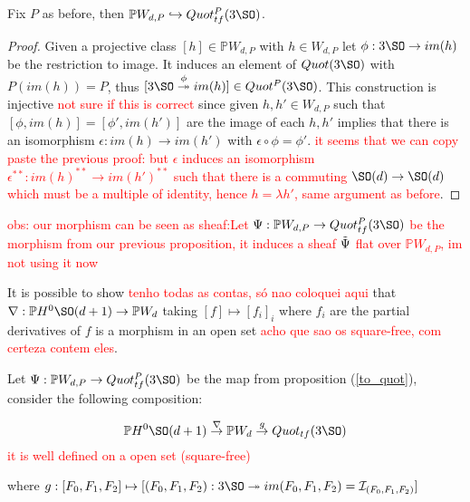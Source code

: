 \begin{proposition}\label{to_quot}
Fix $P$ as before, then $\mathbb{P}W_{d,P} \hookrightarrow Quot^P_{tf}(3\SO)$.
\end{proposition}
\begin{proof}
Given a projective class $[h] \in \mathbb{P}W_{d,P}$ with $h \in W_{d,P}$ let $\phi : 3\SO \to im(h)$ be the restriction to image. It induces an element of $Quot(3\SO)$ with $P(im(h)) = P$, thus $[3\SO \overset{\phi}\twoheadrightarrow im(h)] \in Quot^P(3\SO)$. This construction is injective \textcolor{red}{not sure if this is correct} since given $h,h' \in W_{d,P}$ such that $[\phi,im(h)] = [\phi',im(h')]$ are the image of each $h,h'$ implies that there is an isomorphism $\epsilon:im(h) \to im(h')$ with $\epsilon \circ \phi = \phi'$. \textcolor{red}{it seems that we can copy paste the previous proof: but $\epsilon$ induces an isomorphism $\epsilon^{**}: im(h)^{**} \to im(h')^{**}$ such that there is a commuting $\SO(d) \to \SO(d)$ which must be a multiple of identity, hence $h = \lambda h'$, same argument as before}.
\end{proof}

\textcolor{red}{obs: our morphism can be seen as sheaf:Let $\Psi:\mathbb{P}W_{d,P} \to Quot^P_{tf}(3\SO)$ be the morphism from our previous proposition, it induces a sheaf $\Tilde{\Psi}$ flat over $\mathbb{P}W_{d,P}$, im not using it now}

\begin{remark}
It is possible to show \textcolor{red}{tenho todas as contas, só nao coloquei aqui} that $\nabla:\mathbb{P}H^0 \SO(d+1) \to \mathbb{P}W_{d}$ taking $[f] \mapsto [f_i]_i$ where $f_i$ are the partial derivatives of $f$ is a morphism in an open set \textcolor{red}{acho que sao os square-free, com certeza contem eles}.

Let $\Psi:\mathbb{P}W_{d,P} \to Quot^P_{tf}(3\SO)$ be the map from proposition (\ref{to_quot}), consider the following composition:

\begin{equation}
    \mathbb{P}H^0\SO(d+1) \overset{\nabla}{\to} \mathbb{P}W_d  \overset{g}{\to} Quot_{tf}(3\SO)
\end{equation}
\textcolor{red}{it is well defined on a open set (square-free)}

where $g:[F_0,F_1,F_2] \mapsto [(F_0,F_1,F_2):3\SO \twoheadrightarrow im(F_0,F_1,F_2) = \mathcal{I}_{(F_0,F_1,F_2)}]$

\end{remark}